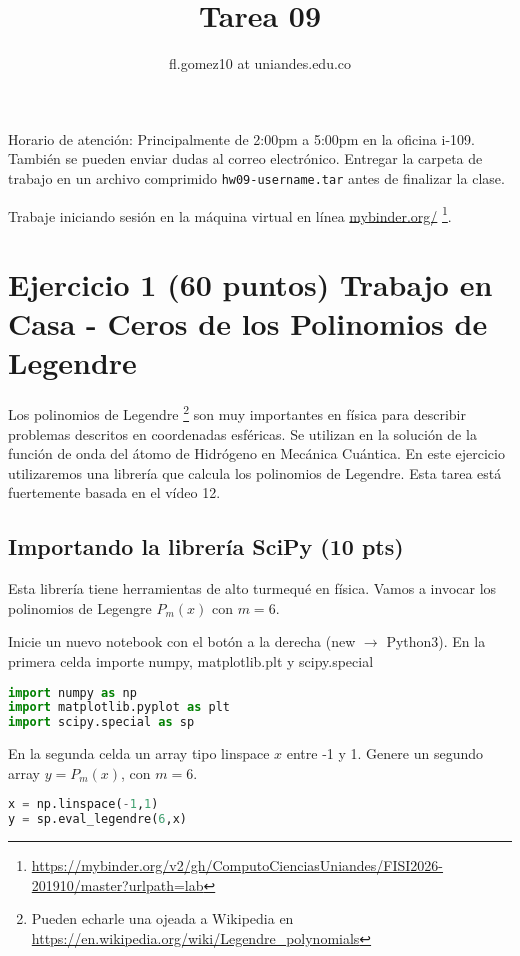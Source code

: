 \documentclass{article}
\title{Tarea 09}
\author{fl.gomez10 at uniandes.edu.co}
\begin{document}
\maketitle

Horario de atención: Principalmente de 2:00pm a 5:00pm en la oficina i-109.
También se pueden enviar dudas al correo electrónico.
Entregar la carpeta de trabajo en un archivo comprimido \texttt{hw09-username.tar}
antes de finalizar la clase. 

Trabaje iniciando  sesión en la máquina virtual en línea
\href{https://mybinder.org/v2/gh/ComputoCienciasUniandes/FISI2026-201910/master?urlpath=lab}{mybinder.org/}
\footnote{\url{https://mybinder.org/v2/gh/ComputoCienciasUniandes/FISI2026-201910/master?urlpath=lab}}. 


\section{Ejercicio 1 (60 puntos) Trabajo en Casa - Ceros de los Polinomios de Legendre}

Los polinomios de Legendre
\footnote{Pueden echarle una ojeada a Wikipedia en \url{https://en.wikipedia.org/wiki/Legendre_polynomials}}
son muy importantes en física para describir problemas descritos en coordenadas
esféricas. Se utilizan en la solución de la función de onda del átomo de Hidrógeno
en Mecánica Cuántica.
En este ejercicio utilizaremos una librería que calcula los polinomios de Legendre.
Esta tarea está fuertemente basada en el vídeo 12.

\subsection{Importando la librería SciPy (10 pts)}
Esta librería tiene herramientas de alto turmequé en física.
Vamos a invocar los polinomios de Legengre $P_m(x)$ con $m=6$.

Inicie un nuevo notebook con el botón a la derecha (new $\rightarrow$ Python3).
En la primera celda importe numpy, matplotlib.plt y scipy.special

\begin{lstlisting}[language=Python]
import numpy as np
import matplotlib.pyplot as plt
import scipy.special as sp
\end{lstlisting}

En la segunda celda un array tipo linspace $x$ entre -1 y 1.
Genere un segundo array $y=P_m(x)$, con $m = 6$.
\begin{lstlisting}[language=Python]
x = np.linspace(-1,1)
y = sp.eval_legendre(6,x)
\end{lstlisting}
\end{document}
